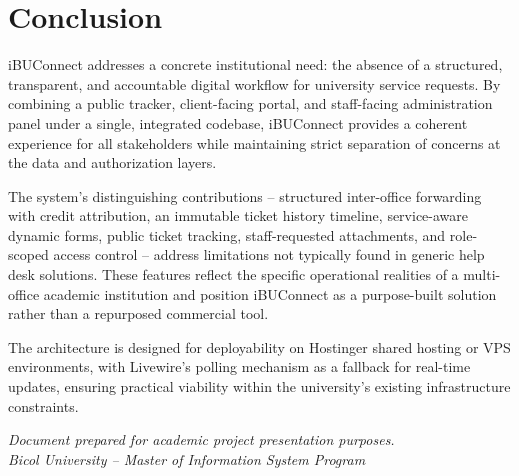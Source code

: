 \documentclass[12pt,a4paper]{article}
\begin{document}
\section{Conclusion}

iBUConnect addresses a concrete institutional need: the absence of a structured, transparent, and accountable digital workflow for university service requests. By combining a public tracker, client-facing portal, and staff-facing administration panel under a single, integrated codebase, iBUConnect provides a coherent experience for all stakeholders while maintaining strict separation of concerns at the data and authorization layers.

The system's distinguishing contributions -- structured inter-office forwarding with credit attribution, an immutable ticket history timeline, service-aware dynamic forms, public ticket tracking, staff-requested attachments, and role-scoped access control -- address limitations not typically found in generic help desk solutions. These features reflect the specific operational realities of a multi-office academic institution and position iBUConnect as a purpose-built solution rather than a repurposed commercial tool.

The architecture is designed for deployability on Hostinger shared hosting or VPS environments, with Livewire's polling mechanism as a fallback for real-time updates, ensuring practical viability within the university's existing infrastructure constraints.

\vfill
\begin{center}
    \textit{Document prepared for academic project presentation purposes.}\\
    \textit{Bicol University -- Master of Information System Program}
\end{center}
\end{document}

